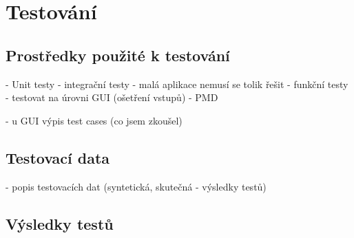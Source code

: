 \chapter{Testování}

	\section{Prostředky použité k testování}
		 - Unit testy 
		 - integrační testy - malá aplikace nemusí se tolik řešit
		 - funkční testy - testovat na úrovni GUI (ošetření vstupů)
		 - PMD
		 
		 - u GUI výpis test cases (co jsem zkoušel)
	
	\section{Testovací data}
		 - popis testovacích dat (syntetická, skutečná - výsledky testů)
	\section{Výsledky testů}
